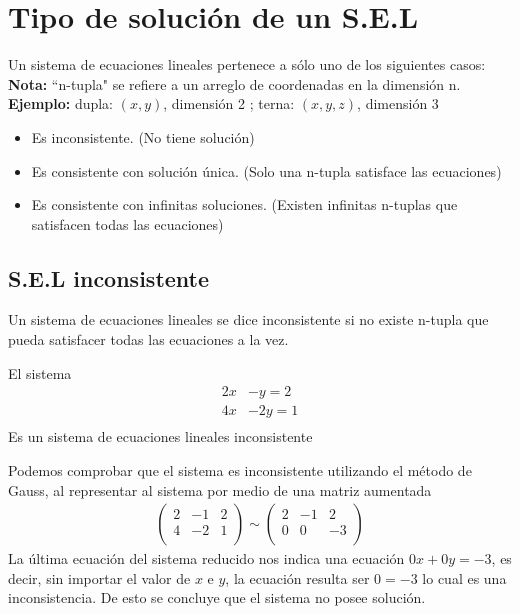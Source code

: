 \section{Tipo de solución de un S.E.L}
Un sistema de ecuaciones lineales pertenece a sólo uno de los siguientes casos:
~\\\textbf{Nota:} ``n-tupla" se refiere a un arreglo de coordenadas en la dimensión n.\\\textbf{Ejemplo: } dupla: $(x,y)$, dimensión 2 ; 
terna: $(x,y,z)$, dimensión 3
\begin{itemize}
\item Es inconsistente. (No tiene solución)
\item Es consistente con solución única. (Solo una n-tupla satisface las ecuaciones)
\item Es consistente con infinitas soluciones. (Existen infinitas n-tuplas que satisfacen todas las ecuaciones)
\end{itemize}
\subsection{S.E.L inconsistente}
Un sistema de ecuaciones lineales se dice inconsistente si no existe n-tupla que pueda satisfacer todas las ecuaciones a la vez. 
\begin{ejemplo}
El sistema 
\begin{align*}
2x&-y=2\\
4x&-2y=1\\
\end{align*}
Es un sistema de ecuaciones lineales inconsistente 
\end{ejemplo}
Podemos comprobar que el sistema es inconsistente utilizando el método de Gauss, al representar al sistema por medio de una matriz aumentada
\begin{align*}
\left(
\begin{array}{rr|r}
2& -1 & 2\\
4& -2 & 1\\
\end{array}
\right)
\sim
\left(
\begin{array}{rr|r}
2& -1 & 2\\
0& 0 & -3\\
\end{array}
\right)
\end{align*}
La última ecuación del sistema reducido nos indica una ecuación $0x+0y=-3$, es decir, sin importar el valor de $x$ e $y$, la ecuación resulta ser $0=-3$ lo cual es una inconsistencia. De esto se concluye que el sistema no posee solución.~\\


